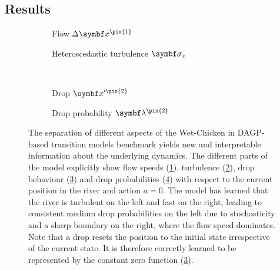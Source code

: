 \subsection{Results}
\label{sub:interpretable_reinforcement_learning:results}
\begin{figure}[tp]
    \centering
    \begin{subfigure}[b]{\halffigurewidth}
        \centering
        
        \caption{
            \label{fig:interpretable_reinforcement_learning:wetchicken:speed}
            Flow $\Delta\mat{x}^{\pix{1}}$
        }
    \end{subfigure}
    \hfill
    \begin{subfigure}[b]{\halffigurewidth}
        \centering
        
        \caption{
            \label{fig:interpretable_reinforcement_learning:wetchicken:hetero}
            Heteroscedastic turbulence $\mat{\sigma}_x$
        }
    \end{subfigure}\\[\figureskip]
    \begin{subfigure}[b]{\halffigurewidth}
        \centering
        
        \caption{
            \label{fig:interpretable_reinforcement_learning:wetchicken:drop}
            Drop $\mat{x}^{\prime\pix{2}}$
        }
    \end{subfigure}
    \hfill
    \begin{subfigure}[b]{\halffigurewidth}
        \centering
        
        \caption{
            \label{fig:interpretable_reinforcement_learning:wetchicken:falldown}
            Drop probability $\mat{\lambda}^{\pix{2}}$
        }
    \end{subfigure}
    \caption{
        \label{fig:interpretable_reinforcement_learning:wetchicken:dynamics}
        The separation of different aspects of the Wet-Chicken in DAGP-based transition models benchmark yields new and interpretable information about the underlying dynamics.
        The different parts of the model explicitly show flow speeds (\cref{fig:interpretable_reinforcement_learning:wetchicken:speed}), turbulence (\cref{fig:interpretable_reinforcement_learning:wetchicken:hetero}), drop behaviour (\cref{fig:interpretable_reinforcement_learning:wetchicken:drop}) and drop probabilities (\cref{fig:interpretable_reinforcement_learning:wetchicken:falldown}) with respect to the current position in the river and action $a = 0$.
        The model has learned that the river is turbulent on the left and fast on the right, leading to consistent medium drop probabilities on the left due to stochasticity and a sharp boundary on the right, where the flow speed dominates.
        Note that a drop resets the position to the initial state irrespective of the current state.
        It is therefore correctly learned to be represented by the constant zero function (\cref{fig:interpretable_reinforcement_learning:wetchicken:drop}).
    }
\end{figure}
